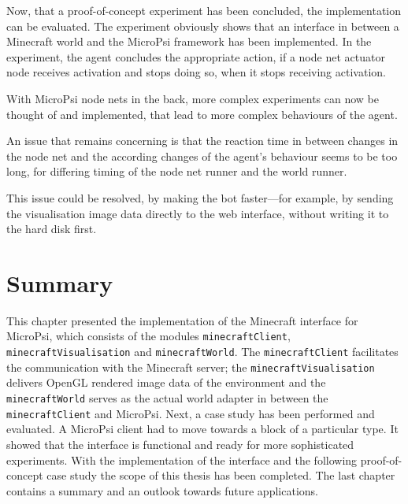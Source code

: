         
Now, that a proof-of-concept experiment has been concluded, the implementation can be evaluated.
The experiment obviously shows that an interface in between a Minecraft world and the MicroPsi framework has been implemented. In the experiment, the agent concludes the appropriate action, if a node net actuator node receives activation and stops doing so, when it stops receiving activation.

With MicroPsi node nets in the back, more complex experiments can now be thought of and implemented, that lead to more complex behaviours of the agent.

An issue that remains concerning is that the reaction time in between changes in the node net and the according changes of the agent's behaviour seems to be too long, for differing timing of the node net runner and the world runner.

This issue could be resolved, by making the bot faster---for example, by sending the visualisation image data directly to the web interface, without writing it to the hard disk first.

    \section{Summary}
This chapter presented the implementation of the Minecraft interface for MicroPsi, which consists of the modules \texttt{minecraftClient}, \texttt{minecraftVisualisation} and \texttt{minecraftWorld}. The \texttt{minecraftClient} facilitates the communication with the Minecraft server; the \texttt{minecraftVisualisation} delivers OpenGL rendered image data of the environment and the \texttt{minecraftWorld} serves as the actual world adapter in between the \texttt{minecraftClient} and MicroPsi.
Next, a case study has been performed and evaluated. A MicroPsi client had to move towards a block of a particular type. It showed that the interface is functional and ready for more sophisticated experiments.
With the implementation of the interface and the following proof-of-concept case study the scope of this thesis has been completed. The last chapter contains a summary and an outlook towards future applications.